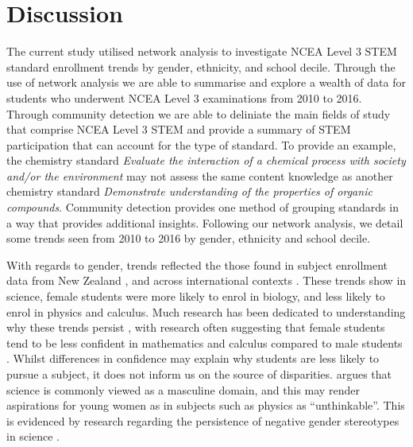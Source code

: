 \documentclass[a4paper]{article}
\begin{document}
\section{Discussion}
The current study utilised network analysis to investigate NCEA Level 3 STEM standard enrollment trends by gender, ethnicity, and school decile. Through the use of network analysis we are able to summarise and explore a wealth of data for students who underwent NCEA Level 3 examinations from 2010 to 2016. Through community detection we are able to deliniate the main fields of study that comprise NCEA Level 3 STEM and provide a summary of STEM participation that can account for the type of standard. To provide an example, the chemistry standard \textit{Evaluate the interaction of a chemical process with society and/or the environment} may not assess the same content knowledge as another chemistry standard \textit{Demonstrate understanding of the properties of organic compounds}. Community detection provides one method of grouping standards in a way that provides additional insights. Following our network analysis, we detail some trends seen from 2010 to 2016 by gender, ethnicity and school decile.

With regards to gender, trends reflected the those found in subject enrollment data from New Zealand \citep{EducationCounts_2018}, and across international contexts \citep{Else_Quest_2013, Sheldrake_2015, NSF, InstituteofPhysics_2013}. These trends show in science, female students were more likely to enrol in biology, and less likely to enrol in physics and calculus. Much research has been dedicated to understanding why these trends persist \citep{Blickenstaff_2005,cheryan2017some}, with research often suggesting that female students tend to be less confident in mathematics and calculus compared to male students \citep{Hofer_2016, Heilbronner_2012, Simon_2015}. Whilst differences in confidence may explain why students are less likely to pursue a subject, it does not inform us on the source of disparities. \cite{Archer_2013} argues that science is commonly viewed as a masculine domain, and this may render aspirations for young women as in subjects such as physics as ``unthinkable''. This is evidenced by research regarding the persistence of negative gender stereotypes in science \cite{Nosek_2009,LaCosse_2016}. 
\end{document}
